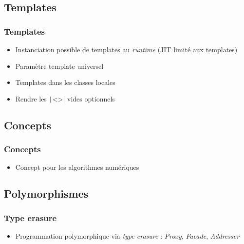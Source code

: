 \documentclass[C++.tex]{subfiles}
\begin{document}
\subsection*{Templates}
\begin{frame}[fragile]
	\frametitle{Templates}
	\begin{itemize}
		\item Instanciation possible de templates au \textit{runtime} (JIT limité aux templates)


		\item Paramètre template universel


		\item Templates dans les classes locales
		\item Rendre les \texttt|<>| vides optionnels
	\end{itemize}

\end{frame}

\subsection*{Concepts}
\begin{frame}[fragile]
	\frametitle{Concepts}
	\begin{itemize}
		\item Concept pour les algorithmes numériques
	\end{itemize}

\end{frame}

\subsection*{Polymorphismes}
\begin{frame}[fragile]
	\frametitle{Type erasure}
	\begin{itemize}
		\item Programmation polymorphique via \textit{type erasure} : \textit{Proxy}, \textit{Facade}, \textit{Addresser}

	\end{itemize}
\end{frame}
\end{document}
